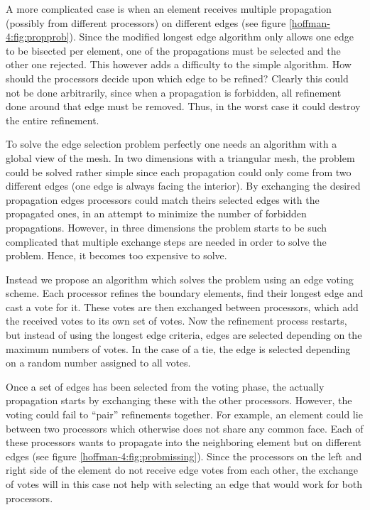 A more complicated case is when an element receives multiple
propagation (possibly from different processors) on different edges
(see figure \ref{hoffman-4:fig:propprob}). Since the modified longest edge
algorithm only allows one edge to be bisected per element, one of the
propagations must be selected and the other one rejected. This however
adds a difficulty to the simple algorithm. How should the processors
decide upon which edge to be refined? Clearly this could not be done
arbitrarily, since when a propagation is forbidden, all refinement
done around that edge must be removed. Thus, in the worst case it
could destroy the entire refinement.

To solve the edge selection problem perfectly one needs an algorithm
with a global view of the mesh. In two dimensions with a triangular
mesh, the problem could be solved rather simple since each propagation
could only come from two different edges (one edge is always facing
the interior). By exchanging the desired propagation edges processors
could match theirs selected edges with the propagated ones, in an
attempt to minimize the number of forbidden propagations. However, in
three dimensions the problem starts to be such complicated that
multiple exchange steps are needed in order to solve the
problem. Hence, it becomes too expensive to solve.

Instead we propose an algorithm which solves the problem using an edge
voting scheme. Each processor refines the boundary elements, find
their longest edge and cast a vote for it. These votes are then
exchanged between processors, which add the received votes to its own
set of votes. Now the refinement process restarts, but instead of
using the longest edge criteria, edges are selected depending on the
maximum numbers of votes. In the case of a tie, the edge is selected
depending on a random number assigned to all votes.

Once a set of edges has been selected from the voting phase, the
actually propagation starts by exchanging these with the other
processors. However, the voting could fail to ``pair'' refinements
together. For example, an element could lie between two processors
which otherwise does not share any common face. Each of these
processors wants to propagate into the neighboring element but on
different edges (see figure \ref{hoffman-4:fig:probmissing}). Since the
processors on the left and right side of the element do not receive
edge votes from each other, the exchange of votes will in this case
not help with selecting an edge that would work for both processors.


